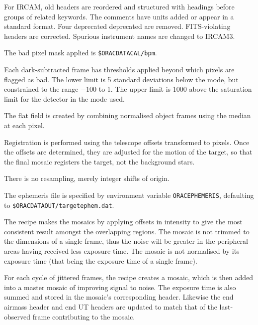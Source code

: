 \documentclass[twoside,11pt]{article}
\renewcommand{\_}{\texttt{\symbol{95}}}
\newcommand{\sstitem}{\item}
\begin{document}
{{{         \sstitem
         For IRCAM, old headers are reordered and structured with
         headings before groups of related keywords.  The comments have
         units added or appear in a standard format.  Four deprecated
         deprecated are removed.  FITS-violating headers are corrected.
         Spurious instrument names are changed to IRCAM3.

         \sstitem
         The bad pixel mask applied is {\tt\$ORAC\_DATA\_CAL/bpm}.

         \sstitem
         Each dark-subtracted frame has thresholds applied beyond which
         pixels are flagged as bad.  The lower limit is 5 standard
         deviations below the mode, but constrained to the range $-$100 to 1.
         The upper limit is 1000 above the saturation limit for the detector
         in the mode used.

         \sstitem
         The flat field is created by combining normalised object
         frames using the median at each pixel.

         \sstitem
         Registration is performed using the telescope offsets
         transformed to pixels.  Once the offsets are determined, they
         are adjusted for the motion of the target, so that the final
         mosaic registers the target, not the background stars.

         \sstitem
         There is no resampling, merely integer shifts of origin.

         \sstitem
         The ephemeris file is specified by environment variable
         {\tt{ORAC\_EPHEMERIS}}, defaulting to {\tt \$ORAC\_DATA\_OUT/target\_ephem.dat}.

         \sstitem
         The recipe makes the mosaics by applying offsets in intensity
         to give the most consistent result amongst the overlapping regions.
         The mosaic is not trimmed to the dimensions of a single frame, thus
         the noise will be greater in the peripheral areas having received
         less exposure time.  The mosaic is not normalised by its exposure
         time (that being the exposure time of a single frame).

         \sstitem
         For each cycle of jittered frames, the recipe creates a mosaic,
         which is then added into a master mosaic of improving signal to
         noise.  The exposure time is also summed and stored in the
	 mosaic's corresponding header.  Likewise the end airmass
	 header and end UT headers are updated to match that of the
	 last-observed frame contributing to the mosaic.

}}}
\end{document}
